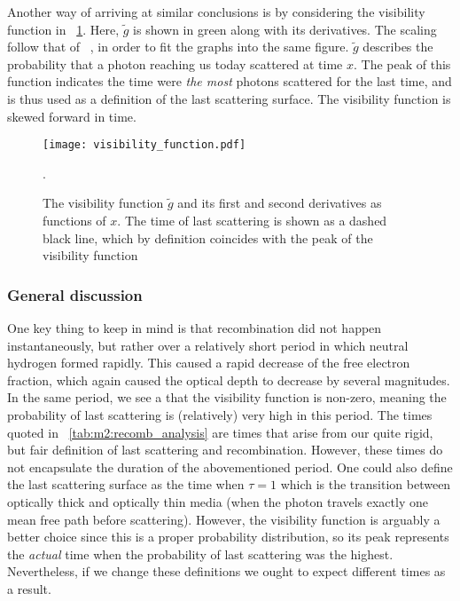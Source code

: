     Another way of arriving at similar conclusions is by considering the visibility function in ~\cref{fig:m2:visibility_function}. Here, $\tilde{g}$ is shown in green along with its derivatives. The scaling follow that of ~\cite{https://doi.org/10.48550/arxiv.astro-ph/0606683}, in order to fit the graphs into the same figure. $\tilde{g}$ describes the probability that a photon reaching us today scattered at time $x$. The peak of this function indicates the time were \textit{the most} photons scattered for the last time, and is thus used as a definition of the last scattering surface. The visibility function is skewed forward in time. 
    \begin{figure}
        \texttt{[image: visibility\_function.pdf]}
        \caption{The visibility function $\tilde{g}$ and its first and second derivatives as functions of $x$. The time of last scattering is shown as a dashed black line, which by definition coincides with the peak of the visibility function}.
        \label{fig:m2:visibility_function}
    \end{figure}

    \subsubsection{General discussion}
    One key thing to keep in mind is that recombination did not happen instantaneously, but rather over a relatively short period in which neutral hydrogen formed rapidly. This caused a rapid decrease of the free electron fraction, which again caused the optical depth to decrease by several magnitudes. In the same period, we see a that the visibility function is non-zero, meaning the probability of last scattering is (relatively) very high in this period. The times quoted in ~\cref{tab:m2:recomb_analysis} are times that arise from our quite rigid, but fair definition of last scattering and recombination. However, these times do not encapsulate the duration of the abovementioned period.  One could also define the last scattering surface as the time when $\tau=1$ which is the transition between optically thick and optically thin media (when the photon travels exactly one mean free path before scattering). However, the visibility function is arguably a better choice since this is a proper probability distribution, so its peak represents the \textit{actual} time when the probability of last scattering was the highest. Nevertheless, if we change these definitions we ought to expect different times as a result.

